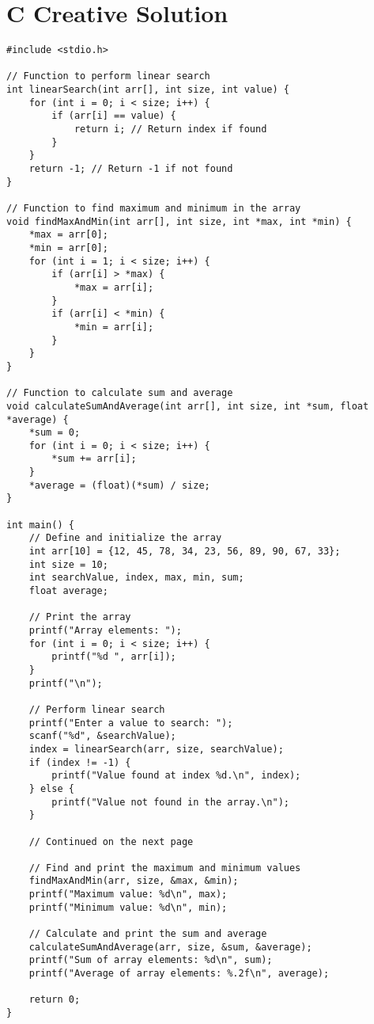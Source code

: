 \documentclass[a4paper,12pt]{article}
\begin{document}
\newpage

\section{C Creative Solution}

\lstset{language=C}
\begin{lstlisting}
#include <stdio.h>

// Function to perform linear search
int linearSearch(int arr[], int size, int value) {
    for (int i = 0; i < size; i++) {
        if (arr[i] == value) {
            return i; // Return index if found
        }
    }
    return -1; // Return -1 if not found
}

// Function to find maximum and minimum in the array
void findMaxAndMin(int arr[], int size, int *max, int *min) {
    *max = arr[0];
    *min = arr[0];
    for (int i = 1; i < size; i++) {
        if (arr[i] > *max) {
            *max = arr[i];
        }
        if (arr[i] < *min) {
            *min = arr[i];
        }
    }
}

// Function to calculate sum and average
void calculateSumAndAverage(int arr[], int size, int *sum, float *average) {
    *sum = 0;
    for (int i = 0; i < size; i++) {
        *sum += arr[i];
    }
    *average = (float)(*sum) / size;
}

int main() {
    // Define and initialize the array
    int arr[10] = {12, 45, 78, 34, 23, 56, 89, 90, 67, 33};
    int size = 10;
    int searchValue, index, max, min, sum;
    float average;

    // Print the array
    printf("Array elements: ");
    for (int i = 0; i < size; i++) {
        printf("%d ", arr[i]);
    }
    printf("\n");

    // Perform linear search
    printf("Enter a value to search: ");
    scanf("%d", &searchValue);
    index = linearSearch(arr, size, searchValue);
    if (index != -1) {
        printf("Value found at index %d.\n", index);
    } else {
        printf("Value not found in the array.\n");
    }

    // Continued on the next page

    // Find and print the maximum and minimum values
    findMaxAndMin(arr, size, &max, &min);
    printf("Maximum value: %d\n", max);
    printf("Minimum value: %d\n", min);

    // Calculate and print the sum and average
    calculateSumAndAverage(arr, size, &sum, &average);
    printf("Sum of array elements: %d\n", sum);
    printf("Average of array elements: %.2f\n", average);

    return 0;
}


\end{lstlisting}
\end{document}

